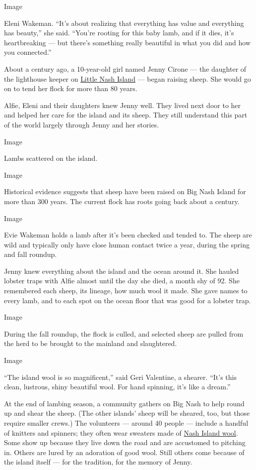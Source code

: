 Image

Eleni Wakeman. ``It's about realizing that everything has value and
everything has beauty,'' she said. ``You're rooting for this baby lamb,
and if it dies, it's heartbreaking --- but there's something really
beautiful in what you did and how you connected.''

About a century ago, a 10-year-old girl named Jenny Cirone --- the
daughter of the lighthouse keeper on
\href{https://www.lighthousefriends.com/light.asp?ID=765}{Little Nash
Island} --- began raising sheep. She would go on to tend her flock for
more than 80 years.

Alfie, Eleni and their daughters knew Jenny well. They lived next door
to her and helped her care for the island and its sheep. They still
understand this part of the world largely through Jenny and her stories.

Image

Lambs scattered on the island.

Image

Historical evidence suggests that sheep have been raised on Big Nash
Island for more than 300 years. The current flock has roots going back
about a century.

Image

Evie Wakeman holds a lamb after it's been checked and tended to. The
sheep are wild and typically only have close human contact twice a year,
during the spring and fall roundup.

Jenny knew everything about the island and the ocean around it. She
hauled lobster traps with Alfie almost until the day she died, a month
shy of 92. She remembered each sheep, its lineage, how much wool it
made. She gave names to every lamb, and to each spot on the ocean floor
that was good for a lobster trap.

Image

During the fall roundup, the flock is culled, and selected sheep are
pulled from the herd to be brought to the mainland and slaughtered.

Image

``The island wool is so magnificent,'' said Geri Valentine, a shearer.
``It's this clean, lustrous, shiny beautiful wool. For hand spinning,
it's like a dream.''

At the end of lambing season, a community gathers on Big Nash to help
round up and shear the sheep. (The other islands' sheep will be sheared,
too, but those require smaller crews.) The volunteers --- around 40
people --- include a handful of knitters and spinners; they often wear
sweaters made of \href{https://www.starcroftfiber.com/yarn/}{Nash Island
wool}. Some show up because they live down the road and are accustomed
to pitching in. Others are lured by an adoration of good wool. Still
others come because of the island itself --- for the tradition, for the
memory of Jenny.

